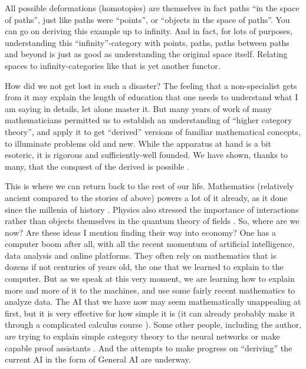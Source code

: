 \documentclass{article}
\begin{document}
All possible deformations (homotopies) are themselves in fact paths “in the space of paths”, just like paths were “points”, or “objects in the space of paths”. You can go on deriving this example up to infinity. And in fact, for lots of purposes, understanding this “infinity”-category with points, paths, paths between paths and beyond is just as good as understanding the original space itself. Relating spaces to infinity-categories like that is yet another functor.

How did we not get lost in such a disaster? The feeling that a non-specialist gets from it may explain the length of education that one needs to understand what I am saying in details, let alone master it. But many years of work of many mathematicians permitted us to establish an understanding of “higher category theory”, and apply it to get “derived” versions of familiar mathematical concepts, to illuminate problems old and new. While the apparatus at hand is a bit esoteric, it is rigorous and sufficiently-well founded. We have shown, thanks to many, that the conquest of the derived is possible \cite{LURIE}.

This is where we can return back to the rest of our life. Mathematics (relatively ancient compared to the stories of above) powers a lot of it already, as it done since the millenia of history \cite{CHILDE}. Physics also stressed the importance of interactions rather than objects themselves in the quantum theory of fields \cite{WEINBERG}. So, where are we now? Are these ideas I mention finding their way into economy? One has a computer boom after all, with all the recent momentum of artificial intelligence, data analysis and online platforms. They often rely on mathematics that is dozens if not centuries of years old, the one that we learned to explain to the computer. But as we speak at this very moment, we are learning how to explain more and more of it to the machines, and use some fairly recent mathematics to analyze data. The AI that we have now may seem mathematically unappealing at first, but it is very effective for how simple it is (it can already probably make it through a complicated calculus course \cite{LAMPCHART}). Some other people, including the author, are trying to explain simple category theory to the neural networks or make capable proof assistants \cite{HOTT}. And the attempts to make progress on “deriving” the current AI in the form of General AI are underway.
\end{document}
